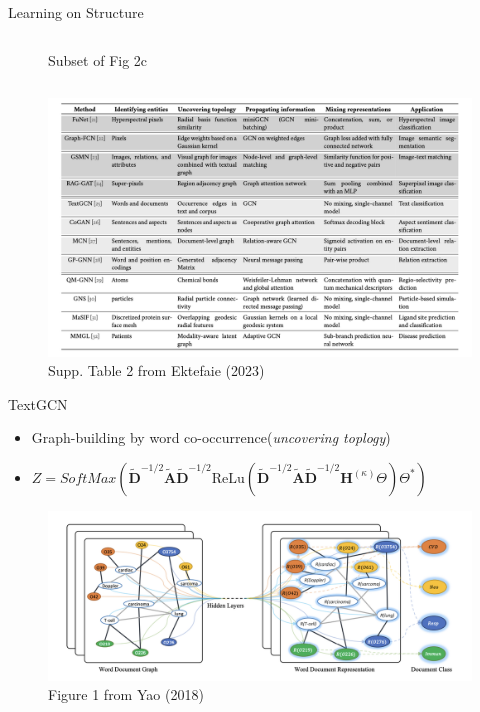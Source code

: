 \documentclass{beamer}
\newcommand{\NodeRepMat}{\mathbf{H}}
\newcommand{\DegMat}{\mathbf{D}}
\newcommand{\iter}{\kappa}
\newcommand{\AdjMat}{\mathbf{A}}
\newcommand{\ReLu}{\text{ReLu}}
\begin{document}
\begin{frame}{Learning on Structure}
\begin{columns}[T]
\begin{column}{0.5\textwidth}
\begin{figure}
            \caption{Subset of Fig 2c \cite{ektefaie_multimodal_2023}}
        \end{figure}    
    \end{column}
\end{columns}
\end{frame}

\begin{frame}{}
    \begin{figure}
        \centering 
        \includegraphics[scale=0.4]{MGL_MethodsTable.png}
        \caption{Supp. Table 2 from Ektefaie (2023) \cite{ektefaie_multimodal_2023}}
    \end{figure}
\end{frame}


\begin{frame}{TextGCN}
    \begin{itemize}
        \item Graph-building by word co-occurrence(\textit{uncovering toplogy}) 
        \item $Z = SoftMax(
            \widetilde{\DegMat}^{-1/2}
            \widetilde{\AdjMat}
            \widetilde{\DegMat}^{-1/2}  
            \ReLu(\widetilde{\DegMat}^{-1/2}
            \widetilde{\AdjMat}
            \widetilde{\DegMat}^{-1/2}  
            \NodeRepMat^{(\iter)}\Theta)\Theta^*)$
    \end{itemize}
    \begin{figure}
        \centering 
        \includegraphics[scale=0.4]{TextGCN_Yao_Fig2.png}
        \caption{Figure 1 from Yao (2018) \cite{yao_graph_2018}}
    \end{figure}
\end{frame}
\end{document}
